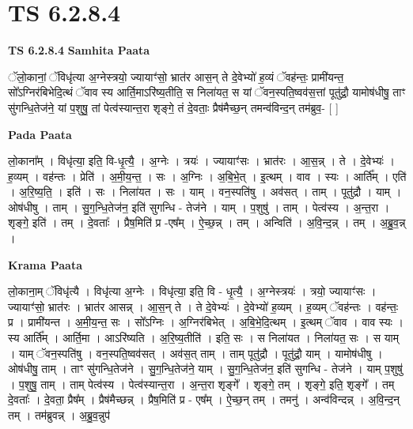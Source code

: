 \documentclass[17pt]{extarticle}
\begin{document}
\section{ TS 6.2.8.4 }

\textbf{TS 6.2.8.4 } \newline
\textbf{Samhita Paata} \newline

ॅलो॒कानां॒ ॅविधृ॑त्या अ॒ग्नेस्त्रयो॒ ज्यायाꣳ॑सो॒ भ्रात॑र आस॒न् ते दे॒वेभ्यो॑ ह॒व्यं ॅवह॑न्तः॒ प्रामी॑यन्त॒ सो᳚ऽग्निर॑बिभेदि॒त्थं ॅवाव स्य आर्ति॒माऽरि॑ष्य॒तीति॒ स निला॑यत॒ स यां ॅवन॒स्पति॒ष्वव॑स॒त्तां पूतु॑द्रौ॒ यामोष॑धीषु॒ ताꣳ सु॑गन्धि॒तेज॑ने॒ यां प॒शुषु॒ तां पेत्व॑स्यान्त॒रा शृङ्गे॒ तं दे॒वताः॒ प्रैष॑मैच्छ॒न् तमन्व॑विन्द॒न् तम॑ब्रुव॒- [  ] \newline

\textbf{Pada Paata} \newline

लो॒काना᳚म् । विधृ॑त्या॒ इति॒ वि-धृ॒त्यै॒ । अ॒ग्नेः । त्रयः॑ । ज्यायाꣳ॑सः । भ्रात॑रः । आ॒स॒न्न् । ते । दे॒वेभ्यः॑ । ह॒व्यम् । वह॑न्तः । प्रेति॑ । अ॒मी॒य॒न्त॒ । सः । अ॒ग्निः । अ॒बि॒भे॒त् । इ॒त्थम् । वाव । स्यः । आर्ति᳚म् । एति॑ । अ॒रि॒ष्य॒ति॒ । इति॑ । सः । निला॑यत । सः । याम् । वन॒स्पति॑षु । अव॑सत् । ताम् । पूतु॑द्रौ । याम् । ओष॑धीषु । ताम् । सु॒ग॒न्धि॒तेज॑न॒ इति॑ सुगन्धि - तेज॑ने । याम् । प॒शुषु॑ । ताम् । पेत्व॑स्य । अ॒न्त॒रा । शृङ्गे॒ इति॑ । तम् । दे॒वताः᳚ । प्रैष॒मिति॑ प्र -एष᳚म् । ऐ॒च्छ॒न्न् । तम् । अन्विति॑ । अ॒वि॒न्द॒न्न् । तम् । अ॒ब्रु॒व॒न्न् ।  \newline


\textbf{Krama Paata} \newline

लो॒काना॒म् ॅविधृ॑त्यै । विधृ॑त्या अ॒ग्नेः । विधृ॑त्या॒ इति॒ वि - धृ॒त्यै॒ । अ॒ग्नेस्त्रयः॑ । त्रयो॒ ज्यायाꣳ॑सः । ज्यायाꣳ॑सो॒ भ्रात॑रः । भ्रात॑र आसन्न् । आ॒स॒न् ते । ते दे॒वेभ्यः॑ । दे॒वेभ्यो॑ ह॒व्यम् । ह॒व्यम् ॅवह॑न्तः । वह॑न्तः॒ प्र । प्रामी॑यन्त । अ॒मी॒य॒न्त॒ सः । सो᳚ऽग्निः । अ॒ग्निर॑बिभेत् । अ॒बि॒भे॒दि॒त्थम् । इ॒त्थम् ॅवाव । वाव स्यः । स्य आर्ति᳚म् । आर्ति॒मा । आऽरि॑ष्यति । अ॒रि॒ष्य॒तीति॑ । इति॒ सः । स निला॑यत । निला॑यत॒ सः । स याम् । याम् ॅवन॒स्पति॑षु । वन॒स्पति॒ष्वव॑सत् । अव॑स॒त् ताम् । ताम् पूतु॑द्रौ । पूतु॑द्रौ॒ याम् । यामोष॑धीषु । ओष॑धीषु॒ ताम् । ताꣳ सु॑गन्धि॒तेज॑ने । सु॒ग॒न्धि॒तेज॑ने॒ याम् । सु॒ग॒न्धि॒तेज॑न॒ इति॑ सुगन्धि - तेज॑ने । याम् प॒शुषु॑ । प॒शुषु॒ ताम् । ताम् पेत्व॑स्य । पेत्व॑स्यान्त॒रा । अ॒न्त॒रा शृङ्‍गे᳚ । शृङ्‍गे॒ तम् । शृङ्‍गे॒ इति॒ शृङ्‍गे᳚ । तम् दे॒वताः᳚ । दे॒वता॒ प्रैष᳚म् । प्रैष॑मैच्छन्न् । प्रैष॒मिति॑ प्र - एष᳚म् । ऐ॒च्छ॒न् तम् । तमनु॑ । अन्व॑विन्दन्न् । अ॒वि॒न्द॒न् तम् । तम॑ब्रुवन्न् । अ॒ब्रु॒व॒न्नुप॑ \newline
\end{document}
